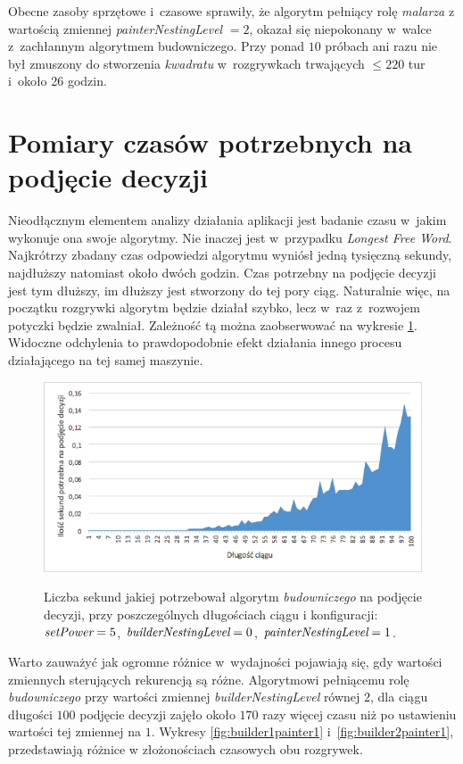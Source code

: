 \documentclass[document]{xmgr}
\begin{document}
Obecne zasoby sprzętowe i~czasowe sprawiły, że algorytm pełniący rolę \emph{malarza} z wartością zmiennej \emph{painterNestingLevel} $=2$, okazał się niepokonany w~walce z~zachłannym algorytmem budowniczego. Przy ponad $10$ próbach ani razu nie był zmuszony do stworzenia \emph{kwadratu} w~rozgrywkach trwających $\leq 220$ tur i~około 26 godzin.



\section{Pomiary czasów potrzebnych na podjęcie decyzji}
Nieodłącznym elementem analizy działania aplikacji jest badanie czasu w~jakim wykonuje ona swoje algorytmy. Nie inaczej jest w~przypadku \emph{Longest Free Word}. Najkrótrzy zbadany czas odpowiedzi algorytmu wyniósł jedną tysięczną sekundy, najdłuższy natomiast około dwóch godzin. Czas potrzebny na podjęcie decyzji jest tym dłuższy, im dłuższy jest stworzony do tej pory ciąg. Naturalnie więc, na początku rozgrywki algorytm będzie działał szybko, lecz w~raz z~rozwojem potyczki będzie zwalniał. Zależność tą można zaobserwować na wykresie \ref{fig:builder0painter1}. Widoczne odchylenia to prawdopodobnie efekt działania innego procesu działającego na tej samej maszynie.

\begin{figure}[tbh]
    \centering
    \caption{Liczba sekund jakiej potrzebował algorytm \emph{budowniczego} na podjęcie decyzji, przy poszczególnych długościach ciągu i konfiguracji: $\emph{setPower}=5$, $\emph{builderNestingLevel}=0$, $\emph{painterNestingLevel}=1$.}
    \includegraphics[width = \textwidth]{images2/timeBuilder0Painter1}
    \label{fig:builder0painter1}
\end{figure}

Warto zauważyć jak ogromne różnice w~wydajności pojawiają się, gdy wartości zmiennych sterujących rekurencją są różne. Algorytmowi pełniącemu rolę \emph{budowniczego} przy wartości zmiennej \emph{builderNestingLevel} równej $2$, dla ciągu długości $100$ podjęcie decyzji zajęło około $170$ razy więcej czasu niż po ustawieniu wartości tej zmiennej na $1$. Wykresy \ref{fig:builder1painter1} i~\ref{fig:builder2painter1}, przedstawiają różnice w złożonościach czasowych obu rozgrywek.
\end{document}
